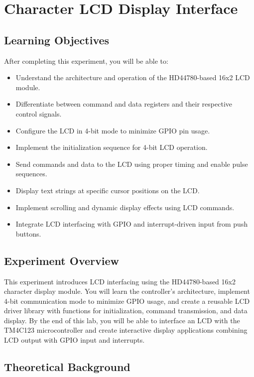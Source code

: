 \chapter{Character LCD Display Interface}

\section*{Learning Objectives}
After completing this experiment, you will be able to:
\begin{itemize}[nosep]
  \item Understand the architecture and operation of the HD44780-based 16x2 LCD module.
  \item Differentiate between command and data registers and their respective control signals.
  \item Configure the LCD in 4-bit mode to minimize GPIO pin usage.
  \item Implement the initialization sequence for 4-bit LCD operation.
  \item Send commands and data to the LCD using proper timing and enable pulse sequences.
  \item Display text strings at specific cursor positions on the LCD.
  \item Implement scrolling and dynamic display effects using LCD commands.
  \item Integrate LCD interfacing with GPIO and interrupt-driven input from push buttons.
\end{itemize}

\section*{Experiment Overview}
This experiment introduces LCD interfacing using the HD44780-based 16x2 character display module. You will learn the controller's architecture, implement 4-bit communication mode to minimize GPIO usage, and create a reusable LCD driver library with functions for initialization, command transmission, and data display. By the end of this lab, you will be able to interface an LCD with the TM4C123 microcontroller and create interactive display applications combining LCD output with GPIO input and interrupts.

\newpage


\section{Theoretical Background}

